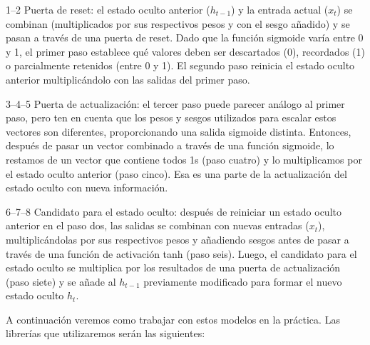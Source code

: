\documentclass[
  a4paper,
  DIV=11,
  numbers=noendperiod]{scrreprt}
\begin{document}
1--2 Puerta de reset: el estado oculto anterior (\(h_{t-1}\)) y la
entrada actual (\(x_t\)) se combinan (multiplicados por sus respectivos
pesos y con el sesgo añadido) y se pasan a través de una puerta de
reset. Dado que la función sigmoide varía entre 0 y 1, el primer paso
establece qué valores deben ser descartados (0), recordados (1) o
parcialmente retenidos (entre 0 y 1). El segundo paso reinicia el estado
oculto anterior multiplicándolo con las salidas del primer paso.

3--4--5 Puerta de actualización: el tercer paso puede parecer análogo al
primer paso, pero ten en cuenta que los pesos y sesgos utilizados para
escalar estos vectores son diferentes, proporcionando una salida
sigmoide distinta. Entonces, después de pasar un vector combinado a
través de una función sigmoide, lo restamos de un vector que contiene
todos 1s (paso cuatro) y lo multiplicamos por el estado oculto anterior
(paso cinco). Esa es una parte de la actualización del estado oculto con
nueva información.

6--7--8 Candidato para el estado oculto: después de reiniciar un estado
oculto anterior en el paso dos, las salidas se combinan con nuevas
entradas (\(x_t\)), multiplicándolas por sus respectivos pesos y
añadiendo sesgos antes de pasar a través de una función de activación
tanh (paso seis). Luego, el candidato para el estado oculto se
multiplica por los resultados de una puerta de actualización (paso
siete) y se añade al \(h_{t-1}\) previamente modificado para formar el
nuevo estado oculto \(h_t\).

A continuación veremos como trabajar con estos modelos en la práctica.
Las librerías que utilizaremos serán las siguientes:
\end{document}
